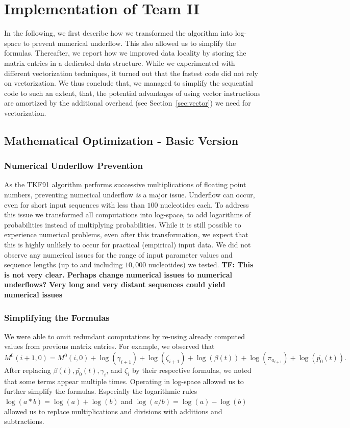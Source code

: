 \documentclass[runningheads,a4paper]{llncs}
\begin{document}
\section{Implementation of Team II}
\label{sec:implementation-2}

In the following, we first describe how we transformed the algorithm into log-space to prevent numerical underflow. 
This also allowed us to simplify the formulas. 
Thereafter, we report how we improved data locality by storing the matrix entries in a dedicated data structure. 
While we experimented with different vectorization techniques, it turned out that the fastest code did not rely on vectorization. 
We thus conclude that, we managed to simplify the sequential code to such an extent, that, the potential advantages of using vector instructions 
are amortized by the additional overhead (see Section~\ref{sec:vector}) we need for vectorization.

\subsection{Mathematical Optimization - Basic Version}

\subsubsection{Numerical Underflow Prevention}
\label{sec:log}

As the TKF91 algorithm performs successive multiplications of floating point numbers, preventing numerical underflow
{\em is} a major issue. Underflow can occur, even for short input sequences with less than $100$ nucleotides each.
To address this issue we transformed all computations into log-space, to add logarithms of probabilities instead of multiplying probabilities.
While it is still possible to experience numerical problems, even after this transformation, 
we expect that this is highly unlikely to occur for practical (empirical) input data.
We did not observe any numerical issues for the range of input parameter values and sequence lengths (up to and including $10,000$ nucleotides) 
we tested. \textbf{TF: This is not very clear. Perhaps change numerical issues to numerical underflows? Very long and very distant sequences could yield numerical issues}

\subsubsection{Simplifying the Formulas}  
We were able to omit redundant computations by re-using already computed values from previous matrix entries.
For example, we observed that $$M^0(i+1,0) = M^0(i,0) + \log(\gamma_{i+1}) + \log(\zeta_{i+1}) + \log(\beta(t)) + \log(\pi_{a_{i+1}}) + \log(\bar{p_0}(t)).$$
After replacing $\beta(t), \bar{p_0}(t), \gamma_i$, and $\zeta_i$ by their respective formulas, we noted that some terms appear multiple times. 
Operating in log-space allowed us to further simplify the formulas. Especially the logarithmic rules $\log(a*b) = \log(a) + \log(b)$ and $\log(a/b) = \log(a) - \log(b)$ 
allowed us to replace multiplications and divisions with additions and subtractions.
\end{document}
